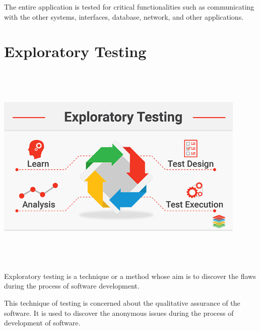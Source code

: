 \par
\bigskip

The entire application is tested for critical functionalities such as 
communicating with the other systems, interfaces, database, network, and other 
applications. 

\section{Exploratory Testing}
\begin{center}
    \includegraphics[width=12cm,height=10cm,keepaspectratio]{images/xenonstack-what-is-exploratory-testing}
\end{center}
Exploratory testing is a technique or a method whose aim is to discover the
flaws during the process of software development. 

\par
\bigskip

This technique of testing is concerned about the qualitative assurance of the 
software. It is used to discover the anonymous issues during the process of 
development of software. 

